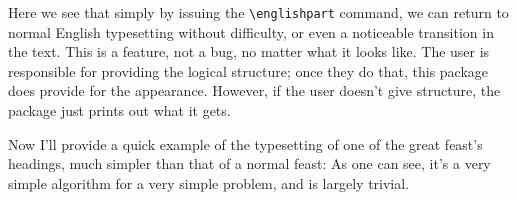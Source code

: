 \documentclass{article}
\begin{document}
\englishpart

Here we see that simply by issuing the \verb|\englishpart| command,
we can return to normal English typesetting without difficulty, or
even a noticeable transition in the text.  This is a feature, not a
bug, no matter what it looks like.  The user is responsible for
providing the logical structure; once they do that, this package
does provide for the appearance.  However, if the user doesn't give
structure, the package just prints out what it gets.

Now I'll provide a quick example of the typesetting of one
of the great feast's headings, much simpler than that of a
normal feast:
As one can see, it's a very simple algorithm for a very
simple problem, and is largely trivial.
\end{document}
